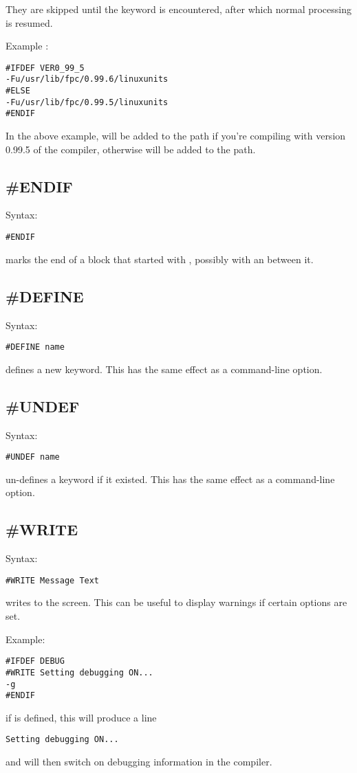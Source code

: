 \documentclass{report}
\begin{document}
They are skipped until the keyword  is
encountered, after which normal processing is resumed.

Example :
\begin{verbatim}
#IFDEF VER0_99_5
-Fu/usr/lib/fpc/0.99.6/linuxunits
#ELSE
-Fu/usr/lib/fpc/0.99.5/linuxunits
#ENDIF
\end{verbatim}
In the above example,  will be added to
the path if you're compiling with version 0.99.5 of the compiler,
otherwise  will be added to the path.

\subsection{\#ENDIF}
Syntax:
\begin{verbatim}
#ENDIF
\end{verbatim}
 marks the end of a block that started with ,
possibly with an  between it.

\subsection{\#DEFINE}
Syntax:
\begin{verbatim}
#DEFINE name
\end{verbatim}
 defines a new keyword. This has the same effect as a
  command-line option.

\subsection{\#UNDEF}
Syntax:
\begin{verbatim}
#UNDEF name
\end{verbatim}
 un-defines a keyword if it existed.
This has the same effect as a   command-line option.

\subsection{\#WRITE}
Syntax:
\begin{verbatim}
#WRITE Message Text
\end{verbatim}
 writes  to the screen.
This can be useful to display warnings if certain options are set.

Example:
\begin{verbatim}
#IFDEF DEBUG
#WRITE Setting debugging ON...
-g
#ENDIF
\end{verbatim}
if  is defined, this will produce a line
\begin{verbatim}
Setting debugging ON...
\end{verbatim}
and will then switch on debugging information in the compiler.
\end{document}
